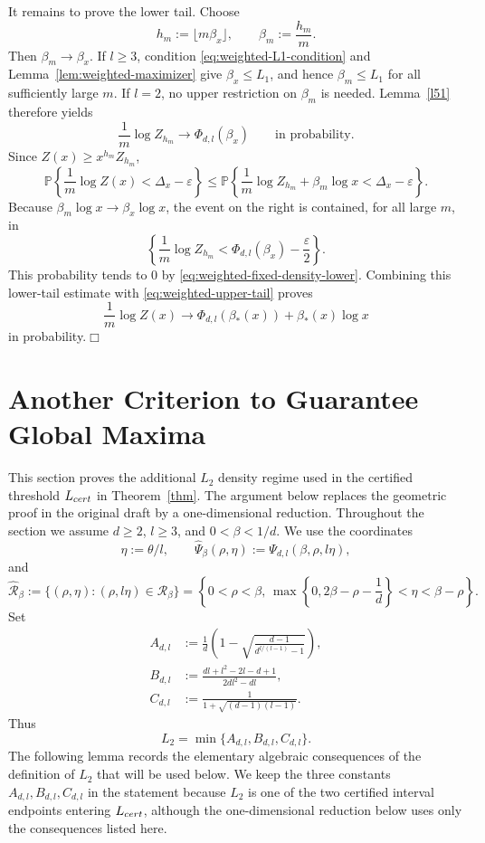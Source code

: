 \documentclass[11pt]{amsart}
\theoremstyle{plain}
\numberwithin{equation}{section}
\numberwithin{theorem}{section}
\numberwithin{figure}{section}
\begin{document}
It remains to prove the lower tail.  Choose
\[
  h_m:=\lfloor m\beta_x\rfloor,\qquad \beta_m:=\frac{h_m}{m}.
\]
Then $\beta_m\to\beta_x$.  If $l\ge3$, condition
\eqref{eq:weighted-L1-condition} and Lemma~\ref{lem:weighted-maximizer} give
$\beta_x\le L_1$, and hence $\beta_m\le L_1$ for all sufficiently large $m$.  If
$l=2$, no upper restriction on $\beta_m$ is needed.  Lemma~\ref{l51} therefore yields
\begin{equation}\label{eq:weighted-fixed-density-lower}
  \frac1m\log Z_{h_m}
  \longrightarrow
  \Phi_{d,l}(\beta_x)
  \qquad\text{in probability}.
\end{equation}
Since $Z(x)\ge x^{h_m}Z_{h_m}$,
\[
\mathbb P\left\{\frac1m\log Z(x)<\Delta_x-\varepsilon\right\}
\le
\mathbb P\left\{\frac1m\log Z_{h_m}+\beta_m\log x<\Delta_x-\varepsilon\right\}.
\]
Because $\beta_m\log x\to\beta_x\log x$, the event on the right is contained,
for all large $m$, in
\[
\left\{\frac1m\log Z_{h_m}<\Phi_{d,l}(\beta_x)-\frac{\varepsilon}{2}\right\}.
\]
This probability tends to $0$ by \eqref{eq:weighted-fixed-density-lower}.
Combining this lower-tail estimate with
\eqref{eq:weighted-upper-tail} proves
\[
  \frac1m\log Z(x)
  \longrightarrow
  \Phi_{d,l}(\beta_*(x))+\beta_*(x)\log x
\]
in probability.\hfill\(\Box\)


\section{Another Criterion to Guarantee Global Maxima}\label{ptc}

This section proves the additional $L_2$ density regime used in the certified
threshold $L_{\rm cert}$ in Theorem~\ref{thm}.  The argument below replaces the
geometric proof in the original draft by a one-dimensional reduction.  Throughout the section we assume \(d\ge2\), \(l\ge3\), and
\(0<\beta<1/d\).  We use the coordinates
\[
  \eta:=\theta/l,\qquad
  \widehat\Psi_\beta(\rho,\eta):=\Psi_{d,l}(\beta,\rho,l\eta),
\]
and
\[
  \widehat{\mathcal R}_\beta
  :=\{(\rho,\eta):(\rho,l\eta)\in\mathcal R_\beta\}
  =\left\{0<\rho<\beta,\,
  \max\left\{0,2\beta-\rho-\frac1d\right\}<\eta<\beta-\rho\right\}.
\]
Set
\begin{align}
A_{d,l}&:=\frac1d\left(1-
        \sqrt{\frac{d-1}{d^{l/(l-1)}-1}}\right),\label{eq:A-dl}\\[2mm]
B_{d,l}&:=\frac{dl+l^2-2l-d+1}{2dl^2-dl},\label{bca1}\\[2mm]
C_{d,l}&:=\frac1{1+\sqrt{(d-1)(l-1)}}.
\end{align}
Thus
\begin{equation}\label{eq:L2-section7}
  L_2=\min\{A_{d,l},B_{d,l},C_{d,l}\}.
\end{equation}
The following lemma records the elementary algebraic consequences of the definition
of $L_2$ that will be used below.  We keep the three constants
$A_{d,l},B_{d,l},C_{d,l}$ in the statement because $L_2$ is one of the two certified
interval endpoints entering $L_{\rm cert}$, although the one-dimensional reduction
below uses only the consequences listed here.
\end{document}
